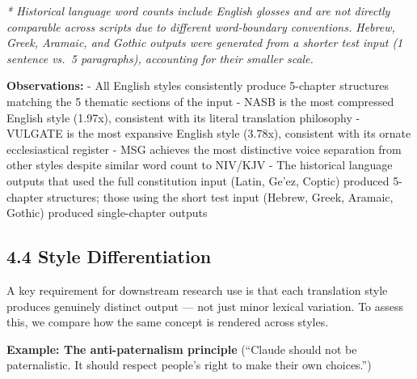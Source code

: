 \documentclass[10pt, letterpaper, twocolumn]{article}
\begin{document}
\emph{* Historical language word counts include English glosses and are not directly comparable across scripts due to different word-boundary conventions. Hebrew, Greek, Aramaic, and Gothic outputs were generated from a shorter test input (1 sentence vs.~5 paragraphs), accounting for their smaller scale.}

\textbf{Observations:} - All English styles consistently produce 5-chapter structures matching the 5 thematic sections of the input - NASB is the most compressed English style (1.97x), consistent with its literal translation philosophy - VULGATE is the most expansive English style (3.78x), consistent with its ornate ecclesiastical register - MSG achieves the most distinctive voice separation from other styles despite similar word count to NIV/KJV - The historical language outputs that used the full constitution input (Latin, Ge'ez, Coptic) produced 5-chapter structures; those using the short test input (Hebrew, Greek, Aramaic, Gothic) produced single-chapter outputs

\subsection*{4.4 Style Differentiation}\label{style-differentiation}

A key requirement for downstream research use is that each translation style produces genuinely distinct output --- not just minor lexical variation. To assess this, we compare how the same concept is rendered across styles.

\textbf{Example: The anti-paternalism principle} (``Claude should not be paternalistic. It should respect people's right to make their own choices.'')
\end{document}
